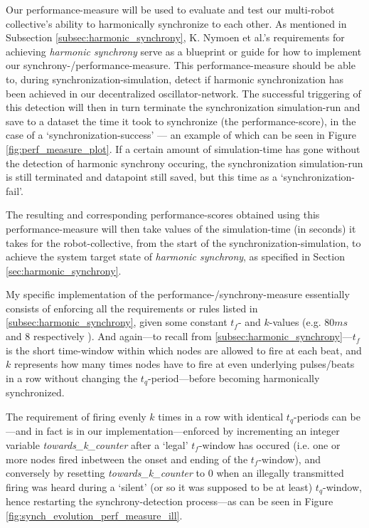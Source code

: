 Our performance-measure will be used to evaluate and test our multi-robot collective's ability to harmonically synchronize to each other. As mentioned in Subsection \ref{subsec:harmonic_synchrony}, K. Nymoen et al.'s requirements for achieving \textit{harmonic synchrony} serve as a blueprint or guide for how to implement our synchrony-/performance-measure. This performance-measure should be able to, during synchronization-simulation, detect if harmonic synchronization has been achieved in our decentralized oscillator-network. The successful triggering of this detection will then in turn terminate the synchronization simulation-run and save to a dataset the time it took to synchronize (the performance-score), in the case of a `synchronization-success' — an example of which can be seen in Figure \ref{fig:perf_measure_plot}. If a certain amount of simulation-time has gone without the detection of harmonic synchrony occuring, the synchronization simulation-run is still terminated and datapoint still saved, but this time as a `synchronization-fail'.

The resulting and corresponding performance-scores obtained using this performance-measure will then take values of the simulation-time (in seconds) it takes for the robot-collective, from the start of the synchronization-simulation, to achieve the system target state of \textit{harmonic synchrony}, as specified in Section \ref{sec:harmonic_synchrony}.

My specific implementation of the performance-/synchrony-measure essentially consists of enforcing all the requirements or rules listed in \ref{subsec:harmonic_synchrony}, given some constant $t_f$- and $k$-values (e.g. $80ms$ and $8$ respectively \cite{nymoen_synch}). And again—to recall from \ref{subsec:harmonic_synchrony}—$t_f$ is the short time-window within which nodes are allowed to fire at each beat, and $k$ represents how many times nodes have to fire at even underlying pulses/beats in a row without changing the $t_q$-period—before becoming harmonically synchronized.

The requirement of firing evenly $k$ times in a row with identical $t_q$-periods can be—and in fact is in our implementation—enforced by incrementing an integer variable \textit{towards\_k\_counter} after a `legal' $t_f$-window has occured (i.e. one or more nodes fired inbetween the onset and ending of the $t_f$-window), and conversely by resetting \textit{towards\_k\_counter} to 0 when an illegally transmitted firing was heard during a `silent' (or so it was supposed to be at least) $t_q$-window, hence restarting the synchrony-detection process—as can be seen in Figure \ref{fig:synch_evolution_perf_measure_ill}.

